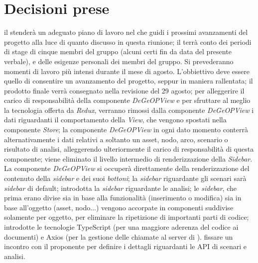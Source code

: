 \documentclass[a4paper,11pt]{article}
\begin{document}
	\section{Decisioni prese}
		\begin{itemize}
			\itemVI il \responsabile{} stenderà un adeguato piano di lavoro nel \pdp{} che guidi i prossimi avanzamenti del progetto alla luce di quanto discusso in questa riunione;
			\itemVI il \responsabile{} terrà conto dei periodi di stage di cinque membri del gruppo (alcuni certi fin da data del presente verbale), e delle esigenze personali dei membri del gruppo. Si prevederanno momenti di lavoro più intensi durante il mese di agosto. L'obbiettivo deve essere quello di consentire un avanzamento del progetto, seppur in maniera rallentata;
			\itemVI il prodotto finale verrà consegnato nella revisione del 29 agosto;
			\itemVI per alleggerire il carico di responsabilità della componente \textit{DeGeOPView} e per sfruttare al meglio la tecnologia offerta da \textit{Redux}, verranno rimossi dalla  componente \textit{DeGeOPView} i dati riguardanti il comportamento della \textit{View}, che vengono spostati nella componente \textit{Store};
			\itemVI la componente \textit{DeGeOPView} in ogni dato momento conterrà alternativamente i dati relativi a soltanto un asset, nodo, arco, scenario o risultato di analisi, alleggerendo ulteriormente il carico di responsabilità di questa componente;
			\itemVI viene eliminato il livello intermedio di renderizzazione della \textit{Sidebar}. La componente \textit{DeGeOPView} si occuperà direttamente della renderizzazione del contenuto della \textit{sidebar} e dei suoi \textit{bottoni};
			\itemVI la \textit{sidebar} riguardante gli scenari sarà \textit{sidebar} di default;
			\itemVI introdotta la \textit{sidebar} riguardante le analisi;
			\itemVI le \textit{sidebar}, che prima erano divise sia in base alla funzionalità (inserimento o modifica) sia in base all'oggetto (asset, nodo...) vengono accorpate in componenti suddivise solamente per oggetto, per eliminare la ripetizione di importanti parti di codice;
			\itemVI introdotte le tecnologie TypeScript (per una maggiore aderenza del codice ai documenti) e Axios (per la gestione delle chiamate al server di \riskapp{}).
			\itemVI fissare un incontro con il proponente per definire i dettagli riguardanti le API di scenari e analisi.
		\end{itemize}
\end{document}

